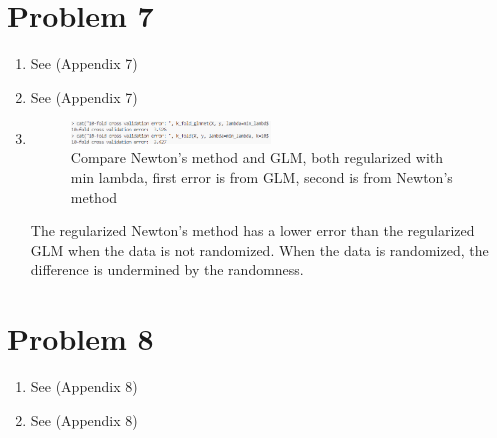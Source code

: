 \documentclass{article}
\begin{document}
\newpage
\section*{Problem 7}
\begin{enumerate}[label=(\alph*)]
  \item  See (Appendix 7)
  \item  See (Appendix 7)
  \item 

  \begin{figure}[h]
      \centering
      \includegraphics[width=0.5\textwidth]{7c.png}
      \caption{Compare Newton's method and GLM, both regularized with min lambda, first error is from GLM, second is from Newton's method}
  \end{figure}

  The regularized Newton's method has a lower error than the regularized GLM when the data is not randomized. When the data is randomized, the difference is undermined by the randomness.

\end{enumerate}

\newpage
\section*{Problem 8}
\begin{enumerate}[label=(\alph*)]
  \item  See (Appendix 8)
  \item  See (Appendix 8)
\end{enumerate}
\end{document}
